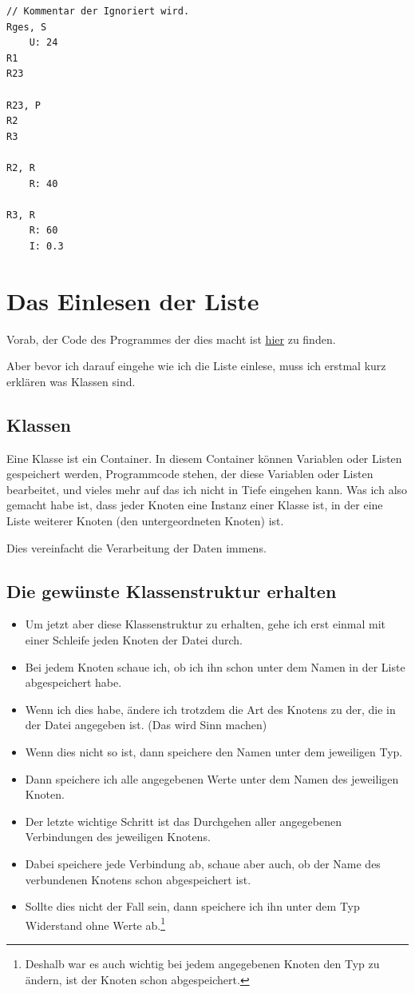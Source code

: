 \documentclass[a4paper,10pt,ngerman]{scrartcl}
\begin{document}
\begin{verbatim}
// Kommentar der Ignoriert wird.
Rges, S
    U: 24
R1
R23

R23, P
R2
R3

R2, R
    R: 40

R3, R
    R: 60
    I: 0.3
\end{verbatim}

\section{Das Einlesen der Liste}

Vorab, der Code des Programmes der dies macht ist \hyperref[subsec:verarbeitung]{\underline{hier}} zu finden.

\noindent Aber bevor ich darauf eingehe wie ich die Liste einlese, muss ich erstmal kurz erklären was Klassen sind.

\subsection{Klassen}

Eine Klasse ist ein Container. In diesem Container können Variablen oder Listen gespeichert werden, Programmcode stehen, der diese Variablen oder Listen bearbeitet, und vieles mehr auf das ich nicht in Tiefe eingehen kann.
Was ich also gemacht habe ist, dass jeder Knoten eine Instanz einer Klasse ist, in der eine Liste weiterer Knoten (den untergeordneten Knoten) ist.

Dies vereinfacht die Verarbeitung der Daten immens.

\subsection{Die gewünste Klassenstruktur erhalten}

\begin{itemize}
\item Um jetzt aber diese Klassenstruktur zu erhalten, gehe ich erst einmal mit einer Schleife jeden Knoten der Datei durch.
\item Bei jedem Knoten schaue ich, ob ich ihn schon unter dem Namen in der Liste abgespeichert habe.
\item Wenn ich dies habe, ändere ich trotzdem die Art des Knotens zu der, die in der Datei angegeben ist. (Das wird Sinn machen)
\item Wenn dies nicht so ist, dann speichere den Namen unter dem jeweiligen Typ.
\item Dann speichere ich alle angegebenen Werte unter dem Namen des jeweiligen Knoten.
\item Der letzte wichtige Schritt ist das Durchgehen aller angegebenen Verbindungen des jeweiligen Knotens.
\item Dabei speichere jede Verbindung ab, schaue aber auch, ob der Name des verbundenen Knotens schon abgespeichert ist.
\item Sollte dies nicht der Fall sein, dann speichere ich ihn unter dem Typ Widerstand ohne Werte ab.\footnote{Deshalb war es auch wichtig bei jedem angegebenen Knoten den Typ zu ändern, ist der Knoten schon abgespeichert.}
\end{itemize}
\end{document}
